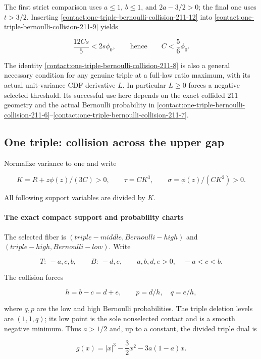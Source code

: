 The first strict comparison uses $a\le 1$, $b\le 1$, and $2a-3/2>0$;
the final one uses $t>3/2$. Inserting \eqref{contact:one-triple-bernoulli-collision-211-12} into \eqref{contact:one-triple-bernoulli-collision-211-9} yields

\[
 \frac{12Cs}{5}<2s\phi_0,
 \qquad\text{hence}\qquad C<\frac56\phi_0.
\]

The identity \eqref{contact:one-triple-bernoulli-collision-211-8} is also a general necessary condition for any genuine
triple at a full-law ratio maximum, with its actual unit-variance CDF
derivative $L$. In particular $L\ge 0$ forces a negative selected threshold.
Its successful use here depends on the exact collided $211$ geometry and
the actual Bernoulli probability in \eqref{contact:one-triple-bernoulli-collision-211-6}--\eqref{contact:one-triple-bernoulli-collision-211-7}.
\subsection{One triple: collision across the upper gap}\label{contact:collision-221-contact-reduction}


Normalize variance to one and write

\[
 K=R+z\phi(z)/(3C)>0,\qquad \tau=CK^3,\qquad
 \sigma=\phi(z)/(CK^2)>0.
\]

All following support variables are divided by $K$.

\paragraph{The exact compact support and probability charts}

The selected fiber is $(triple-middle, Bernoulli-high)$ and
$(triple-high, Bernoulli-low)$. Write

\[
 T:\ -a,c,b,\qquad B:\ -d,e,
 \qquad a,b,d,e>0,\quad -a<c<b.
\]

The collision forces

\[
 h=b-c=d+e,\qquad p=d/h,\quad q=e/h,
\tag{B.15.1}\label{contact:collision-221-contact-reduction-1}
\]

where $q,p$ are the low and high Bernoulli probabilities. The triple
deletion levels are $(1,1,q)$; its low point is the sole nonselected
contact and is a smooth negative minimum. Thus $a>1/2$ and, up to a
constant, the divided triple dual is

\[
 g(x)=|x|^3-\frac32x^2-3a(1-a)x.
\tag{B.15.2}\label{contact:collision-221-contact-reduction-2}
\]


